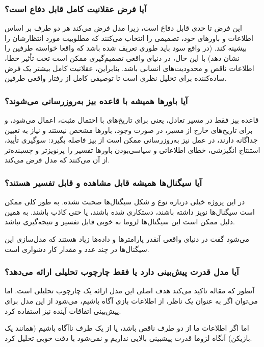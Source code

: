 \documentclass[12pt]{article}
\begin{document}
\subsubsection*{آیا فرض عقلانیت کامل قابل دفاع است؟}

این فرض تا حدی قابل دفاع است، زیرا مدل
 فرض می‌کند هر دو طرف بر اساس اطلاعات و باورهای خود، تصمیمی
 را انتخاب می‌کنند که مطلوبیت مورد انتظارشان را بیشینه کند.
 (در واقع سود باید طوری تعریف شده باشد که واقعا خواسته طرفین را نشان دهد)
 با این حال، در دنیای واقعی تصمیم‌گیری ممکن است تحت تأثیر خطا،
 اطلاعات ناقص و محدودیت‌های انسانی باشد.
 بنابراین، عقلانیت کامل بیشتر یک
 فرض ساده‌کننده برای تحلیل نظری
 است تا توصیفی کامل از رفتار واقعی طرفین.


\subsubsection*{آیا باورها همیشه با قاعده بیز به‌روزرسانی می‌شوند؟}

 قاعده بیز فقط
 در مسیر تعادل، یعنی برای تاریخ‌های با احتمال مثبت، اعمال می‌شود، و
برای تاریخ‌های خارج از مسیر، در صورت وجود،
 باورها مشخص نیستند و نیاز به تعیین جداگانه دارند،
در عمل نیز به‌روزرسانی ممکن است از بیز فاصله بگیرد:
سوگیری تأیید، استنتاج انگیزشی، خطای اطلاعاتی و سیاسی‌بودن باورها
تفسیر را پرنویزتر و چسبنده‌تر از آن می‌کنند که مدل فرض می‌کند.

\subsubsection*{آیا سیگنال‌ها همیشه قابل مشاهده و قابل تفسیر هستند؟}

در این پروژه خیلی درباره نوع و شکل سیگنال‌ها صحبت نشده. به طور کلی
ممکن است سیگنال‌ها نویز داشته باشند، دستکاری شده باشند، یا حتی
کاذب باشند. به همین دلیل ممکن است این سیگنال‌ها لزوما به خوبی
قابل تفسیر و نتیجه‌گیری نباشد. 

می‌شود گفت در دنیای واقعی آنقدر پارامترها و داده‌ها زیاد هستند که مدل‌سازی
این سیگنال‌ها در چند عدد و مقدار کار دشواری است.

\subsubsection*{آیا مدل قدرت پیش‌بینی دارد یا فقط چارچوب تحلیلی ارائه می‌دهد؟}
آنطور که مقاله تاکید می‌کند هدف اصلی این مدل ارائه یک چارچوب تحلیلی است.
اما می‌توان اگر به عنوان یک ناظر، از اطلاعات بازی آگاه باشیم، می‌شود از
این مدل برای پیش‌بینی اتفاقات آینده نیز استفاده کرد.

اما اگر اطلاعات ما از دو طرف ناقص باشد، یا از یک طرف ناآگاه باشیم
(همانند یک بازیکن)
آنگاه لزوما قدرت پیشبینی بالایی نداریم و نمی‌شود با دقت خوبی 
تحلیل کرد.
\end{document}
